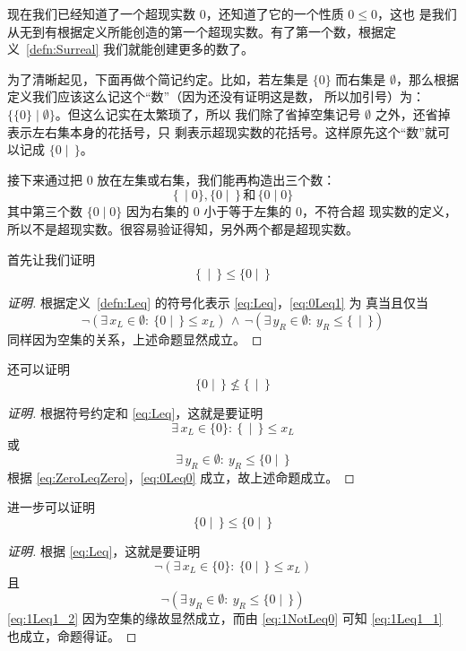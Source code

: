 \documentclass[cs4size,a4paper,adobefonts]{ctexart}
\numberwithin{equation}{section}
\begin{document}
现在我们已经知道了一个超现实数 $0$，还知道了它的一个性质 $0\leq0$，这也
是我们从无到有根据定义所能创造的第一个超现实数。有了第一个数，根据定
义~\ref{defn:Surreal} 我们就能创建更多的数了。

为了清晰起见，下面再做个简记约定。比如，若左集是 $\{0\}$ 而右集是
$\emptyset$，那么根据定义我们应该这么记这个“数”（因为还没有证明这是数，
  所以加引号）为：$\{\{0\}\mid\emptyset\}$。但这么记实在太繁琐了，所以
我们除了省掉空集记号 $\emptyset$ 之外，还省掉表示左右集本身的花括号，只
剩表示超现实数的花括号。这样原先这个“数”就可以记成 $\{0\mid\,\}$。

接下来通过把 $0$ 放在左集或右集，我们能再构造出三个数：
\[
\{\,\mid 0\},\{0\mid\,\}\,\text{和}\,\{0\mid 0\}
\]
其中第三个数 $\{0\mid 0\}$ 因为右集的 $0$ 小于等于左集的 $0$，不符合超
现实数的定义，所以不是超现实数。很容易验证得知，另外两个都是超现实数。

首先让我们证明
\begin{equation}
  \label{eq:0Leq1}
  \{\,\mid\,\}\leq\{0\mid\,\}
\end{equation}
\begin{proof}[证明]
  根据定义~\ref{defn:Leq} 的符号化表示 \eqref{eq:Leq}，\eqref{eq:0Leq1} 为
  真当且仅当
  \[
  \neg(\exists\, x_L \in \emptyset :\: \{0\mid\,\} \leq x_L)\, \wedge \,
  \neg(\exists\, y_R \in \emptyset :\: y_R \leq \{\,\mid\,\})
  \]
  同样因为空集的关系，上述命题显然成立。
\end{proof}

还可以证明
\begin{equation}
  \label{eq:1NotLeq0}
  \{0\mid\,\}\nleq\{\,\mid\,\}
\end{equation}
\begin{proof}[证明]
  根据符号约定和 \eqref{eq:Leq}，这就是要证明
  \begin{equation}
    \label{eq:0Leq0}
    \exists\, x_L \in \{0\} :\: \{\,\mid\,\} \leq x_L
  \end{equation}
  或
  \[
  \exists\, y_R \in \emptyset :\: y_R \leq \{0\mid\,\}
  \]
  根据 \eqref{eq:ZeroLeqZero}，\eqref{eq:0Leq0} 成立，故上述命题成立。
\end{proof}

进一步可以证明
\begin{equation}
  \label{eq:1Leq1}
   \{0\mid\,\}\leq \{0\mid\,\}
\end{equation}
\begin{proof}[证明]
  根据 \eqref{eq:Leq}，这就是要证明
  \begin{equation}
    \label{eq:1Leq1_1}
    \neg(\exists\, x_L \in \{0\} :\: \{0\mid\,\} \leq x_L)    
  \end{equation}
  且
  \begin{equation}
    \label{eq:1Leq1_2}
    \neg(\exists\, y_R \in \emptyset :\: y_R \leq \{0\mid\,\})
  \end{equation}
  \eqref{eq:1Leq1_2} 因为空集的缘故显然成立，而由 \eqref{eq:1NotLeq0}
  可知 \eqref{eq:1Leq1_1} 也成立，命题得证。
\end{proof}
\end{document}
